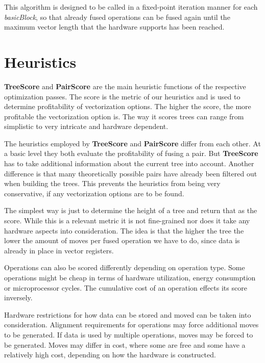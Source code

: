 \documentclass[12pt,a4paper,onecolumn,twoside,openright]{report}
\begin{document}
This algorithm is designed to be called in a fixed-point iteration manner for each \textit{basicBlock}, so that already fused operations can be fused again until the maximum vector length that the hardware supports has been reached.



\section{Heuristics}
\label{sec:treescore}
\textbf{TreeScore} and \textbf{PairScore} are the main heuristic functions of the respective optimization passes. The score is the metric of our heuristics and is used to determine profitability of vectorization options. The higher the score, the more profitable the vectorization option is. The way it scores trees can range from simplistic to very intricate and hardware dependent.

The heuristics employed by \textbf{TreeScore} and \textbf{PairScore} differ from each other. At a basic level they both evaluate the profitability of fusing a pair. But \textbf{TreeScore} has to take additional information about the current tree into account. Another difference is that many theoretically possible pairs have already been filtered out when building the trees. This prevents the heuristics from being very conservative, if any vectorization options are to be found.

The simplest way is just to determine the height of a tree and return that as the score. While this is a relevant metric it is not fine-grained nor does it take any hardware aspects into consideration. The idea is that the higher the tree the lower the amount of moves per fused operation we have to do, since data is already in place in vector registers.

Operations can also be scored differently depending on operation type. Some operations might be cheap in terms of hardware utilization, energy consumption or microprocessor cycles. The cumulative cost of an operation effects its score inversely.

Hardware restrictions for how data can be stored and moved can be taken into consideration. Alignment requirements for operations may force additional moves to be generated. If data is used by multiple operations, moves may be forced to be generated.
Moves may differ in cost, where some are free and some have a relatively high cost, depending on how the hardware is constructed.
\end{document}
